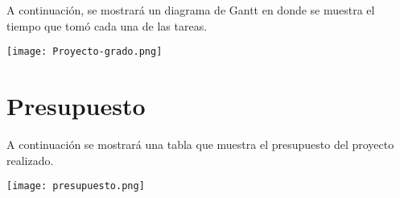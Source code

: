 A continuación, se mostrará un diagrama de Gantt en donde se muestra el tiempo que tomó cada una de las tareas.

\begin{center}
\texttt{[image: Proyecto-grado.png]}
\end{center}


\section{Presupuesto}

A continuación se mostrará una tabla que muestra el presupuesto del proyecto realizado.

\begin{center}
\texttt{[image: presupuesto.png]}
\end{center}